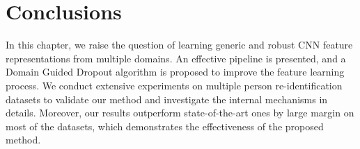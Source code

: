 




\section{Conclusions} %
\label{sec:md-conclusions}

In this chapter, we raise the question of learning generic and robust CNN feature representations from multiple domains. An effective pipeline is presented, and a Domain Guided Dropout algorithm is proposed to improve the feature learning process. We conduct extensive experiments on multiple person re-identification datasets to validate our method and investigate the internal mechanisms in details. Moreover, our results outperform state-of-the-art ones by large margin on most of the datasets, which demonstrates the effectiveness of the proposed method.
